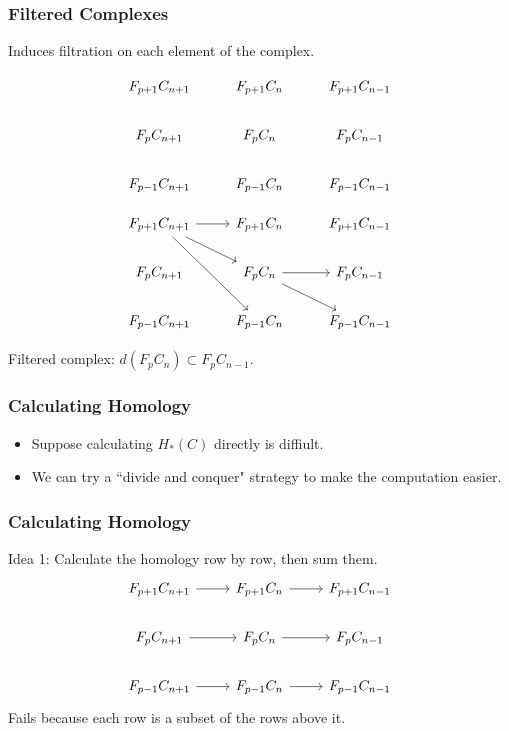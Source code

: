 \documentclass{beamer}
\begin{document}
\begin{frame}[fragile]
	\frametitle{Filtered Complexes}

	Induces filtration on each element of the complex.
	\begin{overprint}
		\[
		\begin{tikzcd}
			F_{p+1}C_{n+1}&F_{p+1}C_{n}&F_{p+1}C_{n-1}\\
			F_{p}C_{n+1}&F_{p}C_{n}&F_{p}C_{n-1}\\
			F_{p-1}C_{n+1}&F_{p-1}C_{n}&F_{p-1}C_{n-1}
		\end{tikzcd}
		\] 

		\[
		\begin{tikzcd}
			F_{p+1}C_{n+1}\arrow[r]\arrow[dr]\arrow[ddr]&F_{p+1}C_{n}&F_{p+1}C_{n-1}\\
			F_{p}C_{n+1}&F_{p}C_{n}\rar\arrow[dr]&F_{p}C_{n-1}\\
			F_{p-1}C_{n+1}&F_{p-1}C_{n}&F_{p-1}C_{n-1}
		\end{tikzcd}
		\] 
	\end{overprint}
	\vfill

	 Filtered complex: $d(F_{p}C_{n}) \subset F_{p}C_{n-1}$.
\end{frame}

\begin{frame}
	\frametitle{Calculating Homology}

	\begin{itemize}
		\item Suppose calculating $H_{*}(C)$ directly is diffiult.
		\item  We can try a ``divide and conquer" strategy to make the computation easier.
	\end{itemize}
\end{frame}

\begin{frame}[fragile]
	\frametitle{Calculating Homology}

	Idea 1: Calculate the homology row by row, then sum them.
	\[
        \begin{tikzcd}
                F_{p+1}C_{n+1}\rar&F_{p+1}C_{n}\rar&F_{p+1}C_{n-1}\\
                F_{p}C_{n+1}\rar&F_{p}C_{n}\rar&F_{p}C_{n-1}\\
                F_{p-1}C_{n+1}\rar&F_{p-1}C_{n}\rar&F_{p-1}C_{n-1}
        \end{tikzcd}
        \]
	Fails because each row is a subset of the rows above it.
\end{frame}
\end{document}
